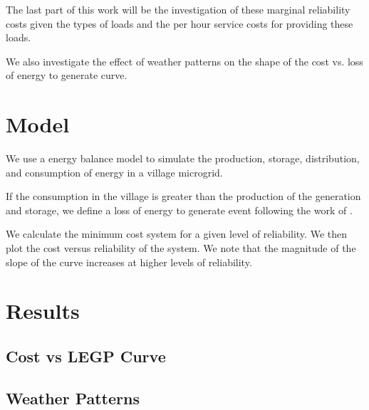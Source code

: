 \documentclass{article}
\begin{document}
The last part of this work will be the investigation of these marginal
reliability costs given the types of loads and the per hour service
costs for providing these loads.

We also investigate the effect of weather patterns on the shape of the
cost vs. loss of energy to generate curve.


\section{Model}
We use a energy balance model to simulate the production, storage,
distribution, and consumption of energy in a village microgrid.

If the consumption in the village is greater than the production of the
generation and storage, we define a loss of energy to generate event
following the work of \cite{}.

We calculate the minimum cost system for a given level of reliability.
We then plot the cost versus reliability of the system.
We note that the magnitude of the slope of the curve increases at higher
levels of reliability.


\section{Results}
\subsection{Cost vs LEGP Curve}
\subsection{Weather Patterns}
\end{document}
